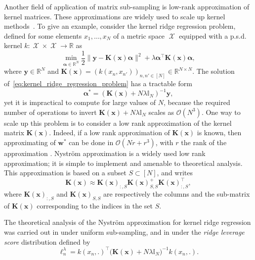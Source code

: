 \documentclass[twoside,11pt]{book}
\numberwithin{theorem}{chapter}
\numberwithin{definition}{chapter}
\numberwithin{proposition}{chapter}
\numberwithin{corollary}{chapter}
\numberwithin{example}{chapter}
\numberwithin{lemma}{chapter}
\numberwithin{assumption}{chapter}
\numberwithin{equation}{chapter}
\numberwithin{figure}{chapter}
\DeclareMathOperator{\Tran}{\intercal}
\DeclareMathOperator{\X}{\mathcal{X}}
\begin{document}
Another field of application of matrix sub-sampling is low-rank approximation of kernel matrices. These approximations are widely used to scale up kernel methods~\parencite{ScSm18,ShCr04}. To give an example, consider the kernel ridge regression problem, defined for
  some elements $x_{1}, \dots, x_{N}$ of a metric space $\X$ equipped with a p.s.d. kernel $k: \X \times \X \rightarrow \mathbb{R}$ as
\begin{equation}\label{eq:kernel_ridge_regression_problem}
\min\limits_{\bm{\alpha} \in \mathbb{R}^{N}} \frac{1}{2}\|\bm{y} - \bm{K}(\bm{x}) \bm{\alpha}\|^{2} + \lambda \bm{\alpha}^{\Tran} \bm{K}(\bm{x}) \bm{\alpha},
\end{equation}
where $\bm{y} \in \mathbb{R}^{N}$ and $\bm{K}(\bm{x}) = (k(x_{n},x_{n'}))_{n,n' \in [N]} \in \mathbb{R}^{N \times N}$.
The solution of~\eqref{eq:kernel_ridge_regression_problem} has a tractable form
\begin{equation}
\bm{\alpha}^{*} = (\bm{K}(\bm{x}) +N\lambda \mathbb{I}_{N})^{-1} \bm{y},
\end{equation}
yet it is impractical to compute for large values of $N$, because the required number of operations to invert $\bm{K}(\bm{x}) +N\lambda \mathbb{I}_{N}$ scales as $\mathcal{O}(N^{3})$. One way to scale up this problem is to consider a low rank approximation of the kernel matrix $\bm{K}(\bm{x})$. Indeed, if a low rank approximation of $\bm{K}(\bm{x})$ is known, then approximating of $\bm{w}^{*}$ can be done in $\mathcal{O}(Nr + r^{3})$, with $r$ the rank of the approximation \parencite{SmSc00,WiSe01}. Nystr{\"o}m approximation is a widely used low rank approximation; it is simple to implement and amenable to theoretical analysis. This approximation is based on a subset $S \subset [N]$, and writes
\begin{equation}
\bm{K}(\bm{x}) \approx \bm{K}(\bm{x})_{:,S} \bm{K}(\bm{x})_{S,S}^{+} \bm{K}(\bm{x})_{:,S}^{\Tran},
\end{equation}
where $\bm{K}(\bm{x})_{:,S}$ and $\bm{K}(\bm{x})_{S,S}$ are respectively the columns and the sub-matrix of $\bm{K}(\bm{x})$ corresponding to the indices in the set $S$.

The theoretical analysis of the Nystr{\"o}m approximation for kernel ridge regression was carried out in \parencite{Bac13} under uniform sub-sampling, and in \parencite{AlMa15} under the 
\emph{ridge leverage score} distribution defined by
\begin{equation}\label{eq:introduction_rlv_score}
\ell^{\lambda}_{n} = k(x_{n},.)^{\Tran} \big( \bm{K}(\bm{x}) + N \lambda \mathbb{I}_{N} \big)^{-1}k(x_{n},.).
\end{equation}
\end{document}
